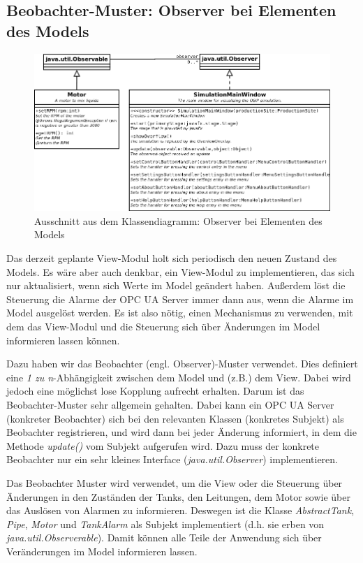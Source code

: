 \documentclass[parskip=full]{scrartcl}
\begin{document}
\subsection{Beobachter-Muster: Observer bei Elementen des Models}
\begin{figure}[H]
  \centering
  \includegraphics[scale=0.35]{design/pattern-screenshots/observer-Model.png}
  \caption{Ausschnitt aus dem Klassendiagramm: Observer bei Elementen des Models}
\end{figure}
Das derzeit geplante View-Modul holt sich periodisch den neuen Zustand des Models. Es wäre aber auch denkbar, ein View-Modul zu implementieren,
das sich nur aktualisiert, wenn sich Werte im Model geändert haben. Außerdem löst die Steuerung die Alarme der OPC UA Server immer dann aus, wenn die Alarme im Model
ausgelöst werden. Es ist also nötig, einen Mechanismus zu verwenden, mit dem das View-Modul und die Steuerung sich über Änderungen im Model informieren
lassen können.

Dazu haben wir das Beobachter (engl. Observer)-Muster verwendet. Dies definiert eine \emph{1 zu n}-Abhängigkeit zwischen dem Model und (z.B.) dem View.
Dabei wird jedoch eine möglichst lose Kopplung aufrecht erhalten. Darum ist das Beobachter-Muster sehr allgemein gehalten. Dabei kann ein OPC UA Server (konkreter Beobachter)
sich bei den relevanten Klassen (konkretes Subjekt) als Beobachter registrieren, und wird dann bei jeder Änderung informiert, in dem die Methode \emph{update()}
vom Subjekt aufgerufen wird. Dazu muss der konkrete Beobachter nur ein sehr kleines Interface (\emph{java.util.Observer}) implementieren.

Das Beobachter Muster wird verwendet, um die View oder die Steuerung über Änderungen in den Zuständen der Tanks, den Leitungen, dem Motor sowie über
das Auslösen von Alarmen zu informieren. Deswegen ist die Klasse \emph{AbstractTank}, \emph{Pipe}, \emph{Motor} und \emph{TankAlarm} als Subjekt implementiert
(d.h. sie erben von \emph{java.util.Observerable}). Damit können alle Teile der Anwendung sich über Veränderungen im Model informieren lassen.
\end{document}
